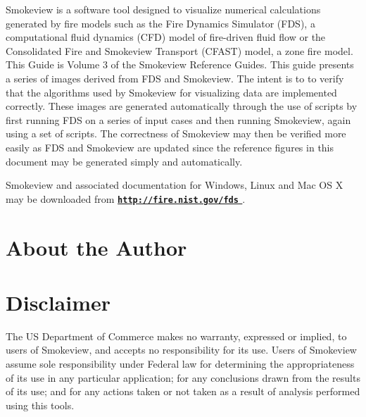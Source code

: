 \documentclass[11pt,twoside]{book}
\newcommand{\hhref}[1]{\href{#1}{{\tt #1}
}}
\begin{document}
Smokeview is a software tool designed to visualize numerical
calculations generated by fire models such as the Fire Dynamics Simulator (FDS),
a computational fluid dynamics (CFD) model of fire-driven fluid
flow or the Consolidated Fire and Smokeview Transport (CFAST) model, a zone fire model. This Guide is Volume 3 of the Smokeview Reference
Guides.
This guide presents a series of images derived from FDS and Smokeview.  The intent is to to verify that the algorithms used by Smokeview for visualizing data are implemented correctly.  These images are generated automatically through the use of scripts by first running FDS on a series of input cases and then running Smokeview,
again using a set of scripts.  The correctness of Smokeview may then be verified more easily as FDS and Smokeview are updated since the reference figures in this document may be generated simply and automatically.

Smokeview and associated
documentation for Windows, Linux and Mac OS X may be downloaded from  {\bf
\hhref{http://fire.nist.gov/fds}} .


\chapter{About the Author}
\begin{description}
\gforneybio
\end{description}


\chapter{Disclaimer}

The US Department of Commerce makes no warranty,
expressed or implied, to users of Smokeview, and accepts no
responsibility for its use. Users of Smokeview assume sole
responsibility under Federal law for determining the
appropriateness of its use in any particular application; for any
conclusions drawn from the results of its use; and for any actions
taken or not taken as a result of analysis performed using this
tools.
\end{document}
